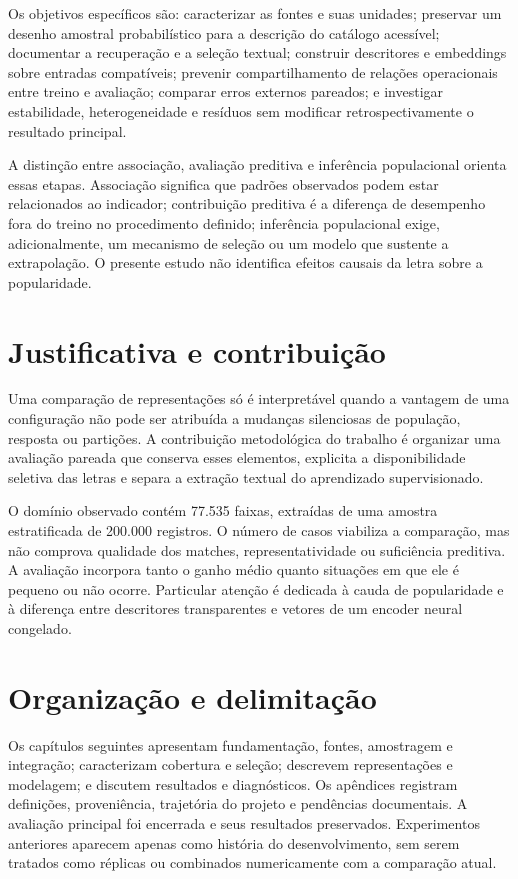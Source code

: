 Os objetivos específicos são: caracterizar as fontes e suas unidades; preservar um desenho amostral probabilístico para a descrição do catálogo acessível; documentar a recuperação e a seleção textual; construir descritores e embeddings sobre entradas compatíveis; prevenir compartilhamento de relações operacionais entre treino e avaliação; comparar erros externos pareados; e investigar estabilidade, heterogeneidade e resíduos sem modificar retrospectivamente o resultado principal.

A distinção entre associação, avaliação preditiva e inferência populacional orienta essas etapas. Associação significa que padrões observados podem estar relacionados ao indicador; contribuição preditiva é a diferença de desempenho fora do treino no procedimento definido; inferência populacional exige, adicionalmente, um mecanismo de seleção ou um modelo que sustente a extrapolação. O presente estudo não identifica efeitos causais da letra sobre a popularidade.

\section{Justificativa e contribuição}
Uma comparação de representações só é interpretável quando a vantagem de uma configuração não pode ser atribuída a mudanças silenciosas de população, resposta ou partições. A contribuição metodológica do trabalho é organizar uma avaliação pareada que conserva esses elementos, explicita a disponibilidade seletiva das letras e separa a extração textual do aprendizado supervisionado.

O domínio observado contém 77.535 faixas, extraídas de uma amostra estratificada de 200.000 registros. O número de casos viabiliza a comparação, mas não comprova qualidade dos matches, representatividade ou suficiência preditiva. A avaliação incorpora tanto o ganho médio quanto situações em que ele é pequeno ou não ocorre. Particular atenção é dedicada à cauda de popularidade e à diferença entre descritores transparentes e vetores de um encoder neural congelado.

\section{Organização e delimitação}
Os capítulos seguintes apresentam fundamentação, fontes, amostragem e integração; caracterizam cobertura e seleção; descrevem representações e modelagem; e discutem resultados e diagnósticos. Os apêndices registram definições, proveniência, trajetória do projeto e pendências documentais. A avaliação principal foi encerrada e seus resultados preservados. Experimentos anteriores aparecem apenas como história do desenvolvimento, sem serem tratados como réplicas ou combinados numericamente com a comparação atual.
